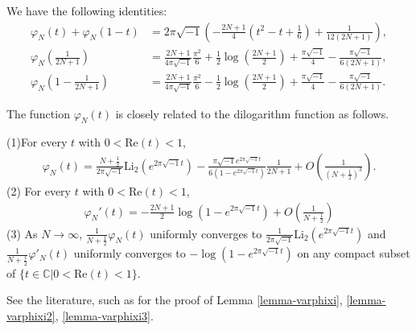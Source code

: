 \documentclass[12pt]{amsart}
\begin{document}
\begin{lemma} \label{lemma-varphixi2}
    We have the following identities:
\begin{align}
    \varphi_N(t)+\varphi_N(1-t)&=2\pi \sqrt{-1}\left(-\frac{2N+1}{4}\left(t^2-t+\frac{1}{6}\right)+\frac{1}{12(2N+1)}\right),\\ 
    \varphi_N\left(\frac{1}{2N+1}\right)&=\frac{2N+1}{4\pi\sqrt{-1}}\frac{\pi^2}{6}+\frac{1}{2}\log \left(\frac{2N+1}{2}\right)+\frac{\pi \sqrt{-1}}{4}-\frac{\pi \sqrt{-1}}{6(2N+1)},\\
    \varphi_N\left(1-\frac{1}{2N+1}\right)&=\frac{2N+1}{4\pi\sqrt{-1}}\frac{\pi^2}{6}-\frac{1}{2}\log \left(\frac{2N+1}{2}\right)+\frac{\pi \sqrt{-1}}{4}-\frac{\pi \sqrt{-1}}{6(2N+1)}.
\end{align}
\end{lemma}
The function $\varphi_N (t)$ is closely related to the dilogarithm function as follows.
\begin{lemma} \label{lemma-varphixi3}
    (1)For every $t$ with $0<\text{Re}(t)<1$, 
    \begin{align}
        \varphi_N(t)=\frac{N+\frac{1}{2}}{2\pi \sqrt{-1}}\text{Li}_2(e^{2\pi\sqrt{-1}t})
 -\frac{\pi \sqrt{-1}e^{2\pi\sqrt{-1}t}}{6(1-e^{2\pi\sqrt{-1}t})}\frac{1}{2N+1}+O\left(\frac{1}{(N+\frac{1}{2})^3}\right).
    \end{align}
    (2) For every $t$ with $0<\text{Re}(t)<1$, 
    \begin{align}
        \varphi_N'(t)=-\frac{2N+1}{2}\log(1-e^{2\pi\sqrt{-1}t})+O\left(\frac{1}{N+\frac{1}{2}}\right)
    \end{align}
    (3) As $N\rightarrow \infty$, $\frac{1}{N+\frac{1}{2}}\varphi_N(t)$ uniformly converges to $\frac{1}{2\pi\sqrt{-1}}\text{Li}_2(e^{2\pi\sqrt{-1}t})$ and $\frac{1}{N+\frac{1}{2}}\varphi'_N(t)$ uniformly converges to $-\log(1-e^{2\pi\sqrt{-1}t})$ on any compact subset of $\{t\in \mathbb{C}|0<\text{Re}(t)<1\}$. 
\end{lemma}
See the literature, such as \cite{Oht16,CJ17,WongYang20-1} for the proof of Lemma \ref{lemma-varphixi}, \ref{lemma-varphixi2}, \ref{lemma-varphixi3}.
\end{document}

